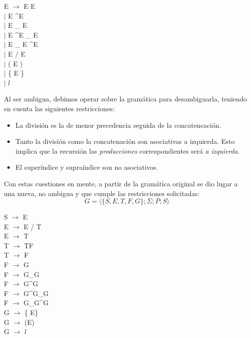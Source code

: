 \begin{center}
 E $\rightarrow$ E E 
\\  $|$ E \textasciicircum E
\\  $|$ E \_ E
\\  $|$ E \textasciicircum E \_ E
\\  $|$ E \_ E \textasciicircum E
\\  $|$ E / E
\\  $|$ ( E )
\\  $|$ \{ E \} 
\\  $|$ $l$
\end{center}

\indent Al ser ambigua, debimos operar sobre la gramática para desambiguarla, teniendo en cuenta las siguientes restricciones:

\begin{itemize}
 \item La división es la de menor precedencia seguida de la concatencación.
  \item Tanto la división como la concatenación son asociativas a izquierda. Esto implica que la recursión las \textit{producciones} correspondientes será \textit{a izquierda}.
  \item El superíndice y supraíndice son no asociativos.
\end{itemize}

\indent Con estas cuestiones en mente, a partir de la gramática original se dio lugar a una nueva, no ambigua y que cumple las restricciones solicitadas:\\

\begin{equation}
    G = \langle \{ S, E, T, F, G\};\Sigma;P;S \rangle
 \end{equation}

\begin{center}
 S $\rightarrow$ E
\\ E $\rightarrow$ E / T
\\ E $\rightarrow$ T
\\ T $\rightarrow$ TF
\\ T $\rightarrow$ F
\\ F $\rightarrow$ G
\\ F $\rightarrow$ G\_G
\\ F $\rightarrow$ G\textasciicircum G
\\ F $\rightarrow$ G\textasciicircum G\_G
\\ F $\rightarrow$ G\_G\textasciicircum G
\\ G $\rightarrow$ \{ E\}
\\ G $\rightarrow$ (E)
\\ G $\rightarrow$ $l$
\end{center}

